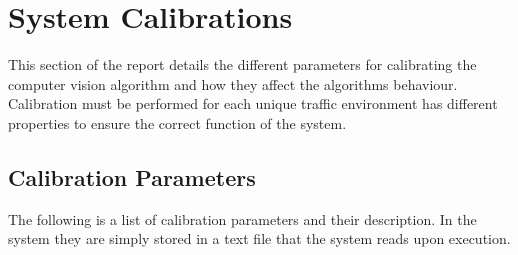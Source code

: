 \chapter{System Calibrations}

This section of the report details the different parameters for calibrating the computer vision algorithm and how they affect the algorithms behaviour. Calibration must be performed for each unique traffic environment has different properties to ensure the correct function of the system. 

\section{Calibration Parameters}

The following is a list of calibration parameters and their description. In the system they are simply stored in a text file that the system reads upon execution.

